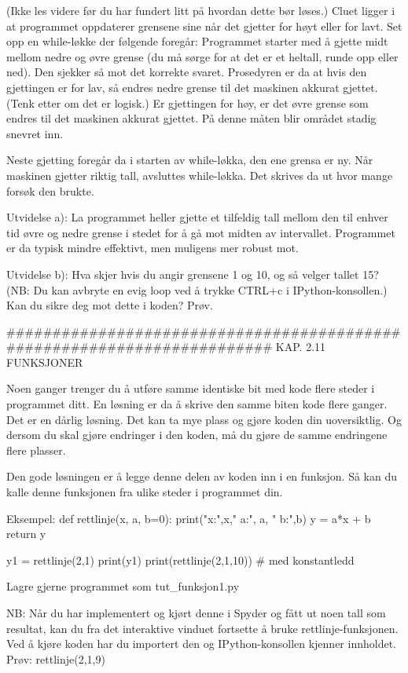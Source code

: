 (Ikke les videre før du har fundert litt på hvordan dette bør løses.) 
Cluet ligger i at programmet oppdaterer grensene sine når det gjetter for høyt
eller for lavt. 
Set opp en while-løkke der følgende foregår: 
Programmet starter med å gjette midt mellom nedre og øvre grense
(du må sørge for at det er et heltall, runde opp eller ned).
Den sjekker så mot det korrekte svaret. 
Prosedyren er da at hvis den gjettingen er for lav,
så endres nedre grense til det maskinen akkurat gjettet.
(Tenk etter om det er logisk.) 
Er gjettingen for høy, er det øvre grense som endres til det maskinen akkurat gjettet.
På denne måten blir området stadig snevret inn.

Neste gjetting foregår da i starten av while-løkka, den ene grensa er ny. 
Når maskinen gjetter riktig tall, avsluttes while-løkka.
Det skrives da ut hvor mange forsøk den brukte. 

Utvidelse a): La programmet heller gjette et tilfeldig tall mellom den til enhver tid
øvre og nedre grense i stedet for å gå mot midten av intervallet.
Programmet er da typisk mindre effektivt, men muligens mer robust mot.

Utvidelse b): Hva skjer hvis du angir grensene 1 og 10, og så velger tallet 15?
(NB: Du kan avbryte en evig loop ved å trykke CTRL+c i IPython-konsollen.) 
Kan du sikre deg mot dette i koden? Prøv. 

######################################################################## 
KAP. 2.11  FUNKSJONER

Noen ganger trenger du å utføre samme identiske bit med kode 
flere steder i programmet ditt.
En løsning er da å skrive den samme biten kode flere ganger.
Det er en dårlig løsning.
Det kan ta mye plass og gjøre koden din uoversiktlig. 
Og dersom du skal gjøre endringer i den koden, 
må du gjøre de samme endringene flere plasser. 

Den gode løsningen er å legge denne delen av koden inn i en funksjon. 
Så kan du kalle denne funksjonen fra ulike steder i programmet din.

Eksempel:
def rettlinje(x, a, b=0):
    print("x:",x,"  a:", a, "  b:",b)
    y = a*x + b
    return y
    
y1 = rettlinje(2,1)
print(y1)
print(rettlinje(2,1,10))   # med konstantledd


Lagre gjerne programmet som tut_funksjon1.py 

NB: Når du har implementert og kjørt denne i Spyder og fått ut noen tall som resultat, 
kan du fra det interaktive vinduet fortsette å bruke rettlinje-funksjonen.
Ved å kjøre koden har du importert den og IPython-konsollen kjenner innholdet. 
Prøv:
rettlinje(2,1,9) 


